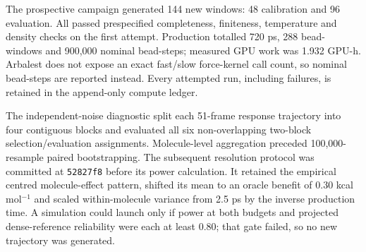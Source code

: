 \documentclass[11pt]{article}
\begin{document}
The prospective campaign generated 144 new windows: 48 calibration and 96 evaluation. All passed prespecified completeness, finiteness, temperature and density checks on the first attempt. Production totalled 720 ps, 288 bead-windows and 900,000 nominal bead-steps; measured GPU work was 1.932 GPU-h. Arbalest does not expose an exact fast/slow force-kernel call count, so nominal bead-steps are reported instead. Every attempted run, including failures, is retained in the append-only compute ledger.

The independent-noise diagnostic split each 51-frame response trajectory into four contiguous blocks and evaluated all six non-overlapping two-block selection/evaluation assignments. Molecule-level aggregation preceded 100,000-resample paired bootstrapping. The subsequent resolution protocol was committed at \texttt{52827f8} before its power calculation. It retained the empirical centred molecule-effect pattern, shifted its mean to an oracle benefit of 0.30 kcal mol$^{-1}$ and scaled within-molecule variance from 2.5 ps by the inverse production time. A simulation could launch only if power at both budgets and projected dense-reference reliability were each at least 0.80; that gate failed, so no new trajectory was generated.
\end{document}
